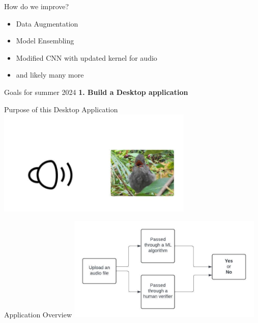 \begin{frame}{How do we improve?}
    \begin{itemize}
        \item Data Augmentation
        \item Model Ensembling
        \item Modified CNN with updated kernel for audio
        \item and likely many more
    \end{itemize}
\end{frame}

%
\begin{frame}{Goals for summer 2024}
    \textbf{1. Build a Desktop application}
\end{frame}
\begin{frame}{Purpose of this Desktop Application}
    \centering  \includegraphics[height=0.7\textheight,width=0.7\textwidth,keepaspectratio]{images/bird.jpeg}
\end{frame}
\begin{frame}{Application Overview}
    \centering  \includegraphics[height=0.7\textheight,width=0.7\textwidth,keepaspectratio]{images/diagram.jpeg}
\end{frame}

